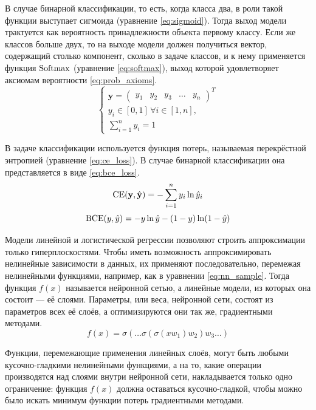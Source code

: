 В случае бинарной классификации, то есть, когда класса два, в роли такой функции выступает сигмоида (уравнение \ref*{eq:sigmoid}). Тогда выход модели трактуется как вероятность принадлежности объекта первому классу. Если же классов больше двух, то на выходе модели должен получиться вектор, содержащий столько компонент, сколько в задаче классов, и к нему применяется функция $\operatorname{Softmax}$ (уравнение \ref*{eq:softmax}), выход которой удовлетворяет аксиомам вероятности \ref*{eq:prob_axioms}.
\begin{equation}
    \label{eq:prob_axioms}
    \begin{cases}
        \mathbf{y}=\left(\begin{matrix}
            y_1 & y_2 & y_3 & \dots & y_n
        \end{matrix}\right)^T \\
        y_i \in [0, 1]\,\forall i\in[1, n], \\
        \sum\limits_{i=1}^n y_i = 1
    \end{cases}
\end{equation}

В задаче классификации используется функция потерь, называемая перекрёстной энтропией (уравнение \ref*{eq:ce_loss}). В случае бинарной классификации она представляется в виде \ref*{eq:bce_loss}.
\begin{equation}
    \label{eq:ce_loss}
    \operatorname{CE}(\mathbf{y},\hat{\mathbf{y}})=-\sum\limits_{i=1}^n y_i \ln \hat{y}_i
\end{equation}
\begin{equation}
    \label{eq:bce_loss}
    \operatorname{BCE}(y,\hat{y})=-y \ln \hat{y} - (1-y)\ln (1-\hat{y})
\end{equation}

Модели линейной и логистической регрессии позволяют строить аппроксимации только гиперплоскостями. Чтобы иметь возможность аппроксимировать нелинейные зависимости в данных, их применяют последовательно, перемежая нелинейными функциями, например, как в уравнении \ref*{eq:nn_sample}. Тогда функция $f(x)$ называется нейронной сетью, а линейные модели, из которых она состоит --- её слоями. Параметры, или веса, нейронной сети, состоят из параметров всех её слоёв, а оптимизируются они так же, градиентными методами.
\begin{equation}
    \label{eq:nn_sample}
    f(x)=\sigma(\dots \sigma(\sigma(xw_1)w_2)w_3 \dots)
\end{equation}

Функции, перемежающие применения линейных слоёв, могут быть любыми кусочно-гладкими нелинейными функциями, а на то, какие операции производятся над слоями внутри нейронной сети, накладывается только одно ограничение: функция $f(x)$ должна оставаться кусочно-гладкой, чтобы можно было искать минимум функции потерь градиентными методами.

